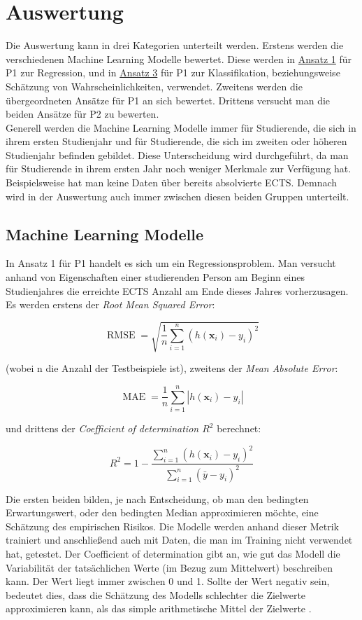 

\section{Auswertung}
\label{sec:auswertung}
Die Auswertung kann in drei Kategorien unterteilt werden. Erstens werden die verschiedenen Machine Learning Modelle bewertet. 
Diese werden in \hyperref[sec:appr1]{Ansatz 1} f\"ur P1 zur Regression, und in \hyperref[sec:appr2]{Ansatz 3} f\"ur P1 zur Klassifikation, 
beziehungsweise Sch\"atzung von Wahrscheinlichkeiten, verwendet.
Zweitens werden die \"ubergeordneten Ans\"atze f\"ur P1 an sich bewertet. 
Drittens versucht man die beiden Ans\"atze f\"ur P2 zu bewerten. \\

Generell werden die Machine Learning Modelle immer f\"ur Studierende, die sich in ihrem ersten Studienjahr und f\"ur Studierende, die sich im 
zweiten oder h\"oheren Studienjahr befinden gebildet. Diese Unterscheidung wird durchgef\"uhrt, da man f\"ur Studierende in ihrem ersten Jahr noch 
weniger Merkmale zur Verf\"ugung hat. Beispielsweise hat man keine Daten \"uber bereits absolvierte ECTS. Demnach wird in der Auswertung 
auch immer zwischen diesen beiden Gruppen unterteilt.


\subsection{Machine Learning Modelle}
In Ansatz 1 f\"ur P1 handelt es sich um ein Regressionsproblem. Man versucht anhand von Eigenschaften einer studierenden Person am Beginn eines Studienjahres 
die erreichte ECTS Anzahl am Ende dieses Jahres vorherzusagen. Es werden erstens der 
\textit{Root Mean Squared Error}: 

$$ \operatorname{RMSE} = \sqrt{\frac{1}{n}\sum_{i = 1}^{n}(h(\mathbf{x}_i)-y_i)^2} $$

(wobei n die Anzahl der Testbeispiele ist), zweitens der \textit{Mean Absolute Error}:

$$ \operatorname{MAE} = \frac{1}{n}\sum_{i = 1}^{n}|h(\mathbf{x}_i) - y_i| $$

und drittens der \textit{Coefficient of determination $R^2$} berechnet: 

$$ R^2 = 1 - \frac{\sum_{i = 1}^{n}(h(\mathbf{x}_i) - y_i)^2}{\sum_{i=1}^n(\bar{y}-y_i)^2} $$

Die ersten beiden bilden, je nach Entscheidung, ob man den bedingten Erwartungswert, oder den bedingten Median
approximieren m\"ochte, eine Sch\"atzung des empirischen Risikos. Die Modelle werden anhand dieser Metrik trainiert und anschlie{\ss}end 
auch mit Daten, die man im Training nicht verwendet hat, getestet. Der Coefficient of determination gibt an, wie gut das Modell 
die Variabilit\"at der tats\"achlichen Werte (im Bezug zum Mittelwert) beschreiben kann. Der Wert liegt immer zwischen 0 und 1. Sollte der Wert negativ sein, 
bedeutet dies, dass die Sch\"atzung des Modells schlechter die Zielwerte approximieren kann, als das simple arithmetische Mittel der Zielwerte \cite{guttag}.  \\


